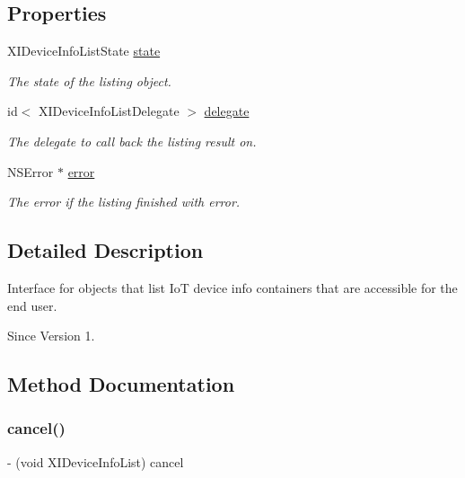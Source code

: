 \subsection*{Properties}
\begin{DoxyCompactItemize}
\item 
X\+I\+Device\+Info\+List\+State \hyperlink{protocol_x_i_device_info_list_01-p_a8a54bd698b750a713a011f20320d91b8}{state}
\begin{DoxyCompactList}\small\item\em The state of the listing object. \end{DoxyCompactList}\item 
id$<$ X\+I\+Device\+Info\+List\+Delegate $>$ \hyperlink{protocol_x_i_device_info_list_01-p_a9daf5d68e18545626decef3f9cb3a2e5}{delegate}
\begin{DoxyCompactList}\small\item\em The delegate to call back the listing result on. \end{DoxyCompactList}\item 
N\+S\+Error $\ast$ \hyperlink{protocol_x_i_device_info_list_01-p_a5a8499ea5b29fd498b9bac875e1fed36}{error}
\begin{DoxyCompactList}\small\item\em The error if the listing finished with error. \end{DoxyCompactList}\end{DoxyCompactItemize}


\subsection{Detailed Description}
Interface for objects that list IoT device info containers that are accessible for the end user. 

\begin{DoxySince}{Since}
Version 1. 
\end{DoxySince}


\subsection{Method Documentation}
\hypertarget{protocol_x_i_device_info_list_01-p_af4c21a4faf1ef66be9606379b55984ca}{}\label{protocol_x_i_device_info_list_01-p_af4c21a4faf1ef66be9606379b55984ca} 
\subsubsection{\texorpdfstring{cancel()}{cancel()}}
{\footnotesize\ttfamily -\/ (void X\+I\+Device\+Info\+List) cancel \begin{DoxyParamCaption}{ }\end{DoxyParamCaption}}



